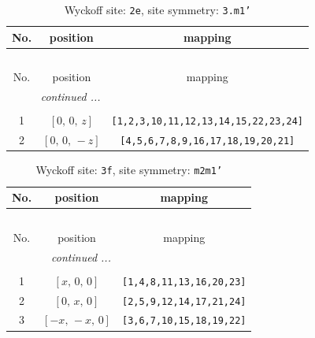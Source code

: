 \documentclass[fleqn,8pt]{jsarticle}
\begin{document}
\begin{longtable}{ccc}
\caption{Wyckoff site: {\tt 2e}, site symmetry: {\tt 3.m1'}}
 \\
 \hline \hline
No. & position & mapping \\ \hline \endfirsthead

\multicolumn{2}{l}{\tablename\ \thetable{}} \\
 \hline \hline
No. & position & mapping \\ \hline \endhead

 \hline \hline
\multicolumn{2}{r}{\footnotesize\it continued ...} \\ \endfoot

 \hline \hline
\multicolumn{2}{r}{} \\ \endlastfoot

1 & $\left[ 0,\, 0,\, z \right]$ & {\tt [1,2,3,10,11,12,13,14,15,22,23,24]} \\ \hline
2 & $\left[ 0,\, 0,\, - z \right]$ & {\tt [4,5,6,7,8,9,16,17,18,19,20,21]} \\
\end{longtable}
\renewcommand{\arraystretch}{1.2}
\begin{longtable}{ccc}
\caption{Wyckoff site: {\tt 3f}, site symmetry: {\tt m2m1'}}
 \\
 \hline \hline
No. & position & mapping \\ \hline \endfirsthead

\multicolumn{2}{l}{\tablename\ \thetable{}} \\
 \hline \hline
No. & position & mapping \\ \hline \endhead

 \hline \hline
\multicolumn{2}{r}{\footnotesize\it continued ...} \\ \endfoot

 \hline \hline
\multicolumn{2}{r}{} \\ \endlastfoot

1 & $\left[ x,\, 0,\, 0 \right]$ & {\tt [1,4,8,11,13,16,20,23]} \\ \hline
2 & $\left[ 0,\, x,\, 0 \right]$ & {\tt [2,5,9,12,14,17,21,24]} \\ \hline
3 & $\left[ - x,\, - x,\, 0 \right]$ & {\tt [3,6,7,10,15,18,19,22]} \\
\end{longtable}
\renewcommand{\arraystretch}{1.2}
\end{document}

